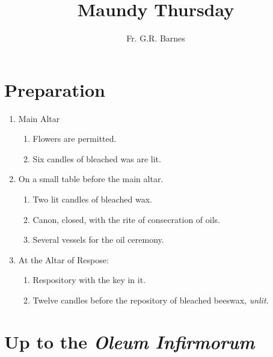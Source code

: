 \documentclass{report}
\title{Maundy Thursday}
\author{Fr. G.R. Barnes}
\begin{document}
\maketitle

\begin{multicols}{2}

\section{Preparation}

\begin{enumerate}[label=\Roman*.]

    \item Main Altar
    
    \begin{enumerate}[label=\arabic*.]

        \item Flowers are permitted.
        \item Six candles of bleached was are lit.
            
    \end{enumerate}

    \item On a small table before the main altar.
    
        \begin{enumerate}[label=\arabic*.]
            \item Two lit candles of bleached wax.
            \item Canon, closed, with the rite of consecration of oils.
            \item Several vessels for the oil ceremony.
        \end{enumerate}

    \item At the Altar of Respose:

        \begin{enumerate}[label=\arabic*.]
            \item Respository with the key in it.
            \item Twelve candles before the repository of bleached beeswax, \textit{unlit.}
        \end{enumerate}
    
\end{enumerate}

\section{Up to the \textit{Oleum Infirmorum}}


\end{multicols}
\end{document}
